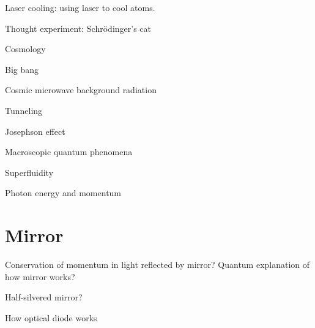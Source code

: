 Laser cooling: using laser to cool atoms.

Thought experiment: Schr\"odinger's cat

Cosmology

Big bang

Cosmic microwave background radiation

Tunneling

Josephson effect


Macroscopic quantum phenomena


Superfluidity


Photon energy and momentum




\section{Mirror}


Conservation of momentum in light reflected by mirror? Quantum explanation of how mirror works?


Half-silvered mirror?

How optical diode works


